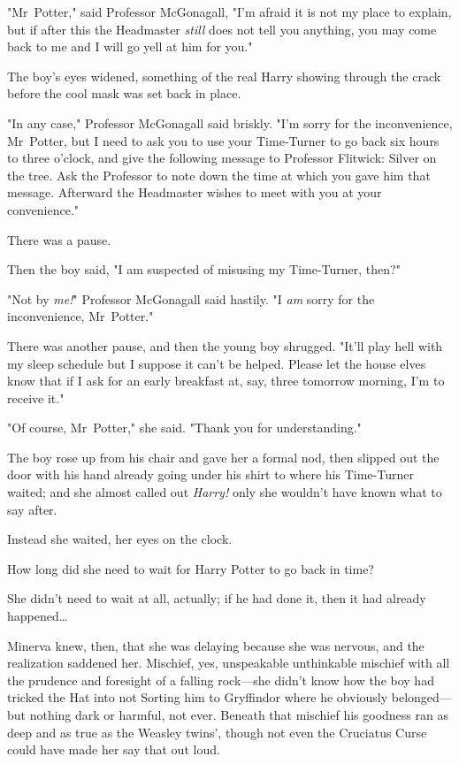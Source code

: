 "Mr~Potter," said Professor McGonagall, "I'm afraid it is not my place to
explain, but if after this the Headmaster \emph{still} does not tell you
anything, you may come back to me and I will go yell at him for you."

The boy's eyes widened, something of the real Harry showing through the crack
before the cool mask was set back in place.

"In any case," Professor McGonagall said briskly. "I'm sorry for the
inconvenience, Mr~Potter, but I need to ask you to use your Time-Turner to go
back six hours to three o'clock, and give the following message to Professor
Flitwick: Silver on the tree. Ask the Professor to note down the time at which
you gave him that message. Afterward the Headmaster wishes to meet with you at
your convenience."

There was a pause.

Then the boy said, "I am suspected of misusing my Time-Turner, then?"

"Not by \emph{me!}" Professor McGonagall said hastily. "I \emph{am} sorry for
the inconvenience, Mr~Potter."

There was another pause, and then the young boy shrugged. "It'll play hell with
my sleep schedule but I suppose it can't be helped. Please let the house elves
know that if I ask for an early breakfast at, say, three \AM tomorrow morning,
I'm to receive it."

"Of course, Mr~Potter," she said. "Thank you for understanding."

The boy rose up from his chair and gave her a formal nod, then slipped out the
door with his hand already going under his shirt to where his Time-Turner
waited; and she almost called out \emph{Harry!} only she wouldn't have known
what to say after.

Instead she waited, her eyes on the clock.

How long did she need to wait for Harry Potter to go back in time?

She didn't need to wait at all, actually; if he had done it, then it had
already happened…

Minerva knew, then, that she was delaying because she was nervous, and the
realization saddened her. Mischief, yes, unspeakable unthinkable mischief with
all the prudence and foresight of a falling rock---she didn't know how the boy
had tricked the Hat into not Sorting him to Gryffindor where he obviously
belonged---but nothing dark or harmful, not ever. Beneath that mischief his
goodness ran as deep and as true as the Weasley twins', though not even the
Cruciatus Curse could have made her say that out loud.

